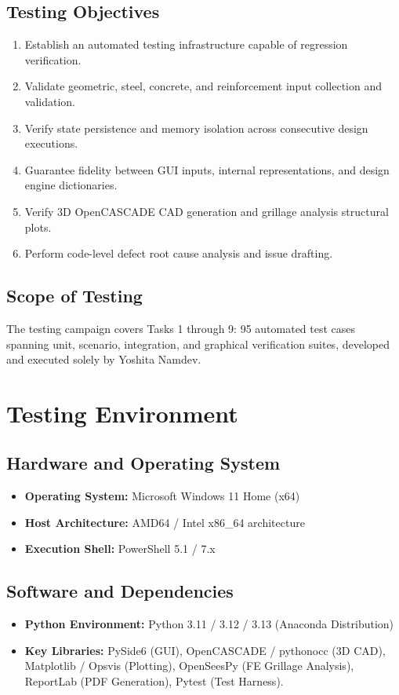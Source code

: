 \documentclass[11pt,a4paper]{report}
\begin{document}
\section{Testing Objectives}
\begin{enumerate}
    \item Establish an automated testing infrastructure capable of regression verification.
    \item Validate geometric, steel, concrete, and reinforcement input collection and validation.
    \item Verify state persistence and memory isolation across consecutive design executions.
    \item Guarantee fidelity between GUI inputs, internal representations, and design engine dictionaries.
    \item Verify 3D OpenCASCADE CAD generation and grillage analysis structural plots.
    \item Perform code-level defect root cause analysis and issue drafting.
\end{enumerate}

\section{Scope of Testing}
The testing campaign covers Tasks 1 through 9: 95 automated test cases spanning unit, scenario, integration, and graphical verification suites, developed and executed solely by Yoshita Namdev.

\chapter{Testing Environment}
\section{Hardware and Operating System}
\begin{itemize}
    \item \textbf{Operating System:} Microsoft Windows 11 Home (x64)
    \item \textbf{Host Architecture:} AMD64 / Intel x86\_64 architecture
    \item \textbf{Execution Shell:} PowerShell 5.1 / 7.x
\end{itemize}

\section{Software and Dependencies}
\begin{itemize}
    \item \textbf{Python Environment:} Python 3.11 / 3.12 / 3.13 (Anaconda Distribution)
    \item \textbf{Key Libraries:} PySide6 (GUI), OpenCASCADE / pythonocc (3D CAD), Matplotlib / Opsvis (Plotting), OpenSeesPy (FE Grillage Analysis), ReportLab (PDF Generation), Pytest (Test Harness).
\end{itemize}
\end{document}

